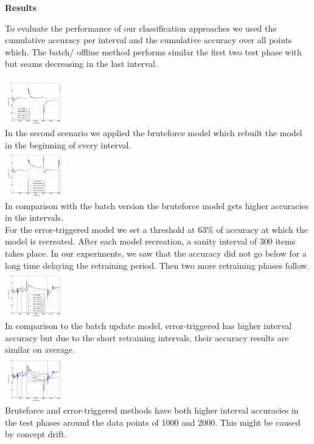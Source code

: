 \begin{center} \textbf{\huge Results} \end{center}
To evaluate the performance of our classification approaches we used the cumulative accuracy per interval and the cumulative accuracy over all points which. The batch/ offline method performs similar the first two test phase with but seams decreasing in the last interval.

 \includegraphics[width=0.2\textwidth]{./plots/batchPlot.png}\\

In the second scenario we applied the bruteforce model which rebuilt the model in the beginning of every interval.\\
   \includegraphics[width=0.2\textwidth]{./plots/bruteforce2_Plot.png}\\
In comparison with the batch version the bruteforce model gets higher accuracies in the intervals.\\

For the error-triggered model we set a threshold at 63\% of accuracy at which the model is recreated. After each model recreation, a sanity interval of 300 items takes place. In our experiments, we saw that the accuracy did not go below for a long time delaying the retraining period. Then two more retraining phases follow.\\
   \includegraphics[width=0.2\textwidth]{./plots/errorTriggeredPlot}\\
In comparison to the batch update model, error-triggered has higher interval accuracy but due to the short retraining intervals, their accuracy results are similar on average. \\

\includegraphics[width=0.2\textwidth]{./plots/errortriggered_batch}\\
Bruteforce and error-triggered methods have both higher interval accuracies in the test phases around the data points of 1000 and 2000. This might be caused by concept drift. 
\\

